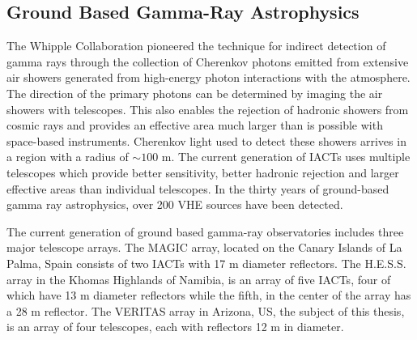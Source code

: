 \documentclass[main.tex]{subfiles}
\begin{document}
\subsection{Ground Based Gamma-Ray Astrophysics}
The Whipple Collaboration pioneered the technique for indirect detection of gamma rays through the collection of Cherenkov photons emitted from extensive air showers generated from high-energy photon interactions with the atmosphere. The direction of the primary photons can be determined by imaging the air showers with telescopes. This also enables the rejection of hadronic showers from cosmic rays and provides an effective area much larger than is possible with space-based instruments. Cherenkov light used to detect these showers arrives in a region with a radius of $\sim 100$ m. The current generation of IACTs uses multiple telescopes which provide better sensitivity, better hadronic rejection and larger effective areas than individual telescopes\cite{Park:2017uxb}. In the thirty years of ground-based gamma ray astrophysics, over 200 VHE sources have been detected. \par
The current generation of ground based gamma-ray observatories includes three major telescope arrays. The MAGIC array, located on the Canary Islands of La Palma, Spain consists of two IACTs with 17 m diameter reflectors. The H.E.S.S. array in the Khomas Highlands of Namibia, is an array of five IACTs, four of which have 13 m diameter reflectors while the fifth, in the center of the array has a 28 m reflector. The VERITAS array in Arizona, US, the subject of this thesis, is an array of four telescopes, each with reflectors 12 m in diameter.
\end{document}
